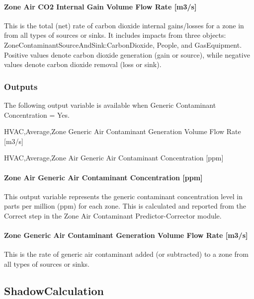 \paragraph{Zone Air CO2 Internal Gain Volume Flow Rate {[}m3/s{]}}\label{zone-air-co2-internal-gain-volume-flow-rate-m3s}

This is the total (net) rate of carbon dioxide internal gains/losses for a zone in \si{\volumeFlowRate} from all types of sources or sinks. It includes impacts from three objects: ZoneContaminantSourceAndSink:CarbonDioxide, People, and GasEquipment. Positive values denote carbon dioxide generation (gain or source), while negative values denote carbon dioxide removal (loss or sink).

\subsubsection{Outputs}\label{outputs-1-024}

The following output variable is available when Generic Contaminant Concentration = Yes.

HVAC,Average,Zone Generic Air Contaminant Generation Volume Flow Rate {[}m3/s{]}

HVAC,Average,Zone Air Generic Air Contaminant Concentration {[}ppm{]}

\paragraph{Zone Air Generic Air Contaminant Concentration {[}ppm{]}}\label{zone-air-generic-air-contaminant-concentration-ppm}

This output variable represents the generic contaminant concentration level in parts per million (ppm) for each zone. This is calculated and reported from the Correct step in the Zone Air Contaminant Predictor-Corrector module.

\paragraph{Zone Generic Air Contaminant Generation Volume Flow Rate {[}m3/s{]}}\label{zone-generic-air-contaminant-generation-volume-flow-rate-m3s}

This is the rate of generic air contaminant added (or subtracted) to a zone from all types of sources or sinks.

\subsection{ShadowCalculation}\label{shadowcalculation}


